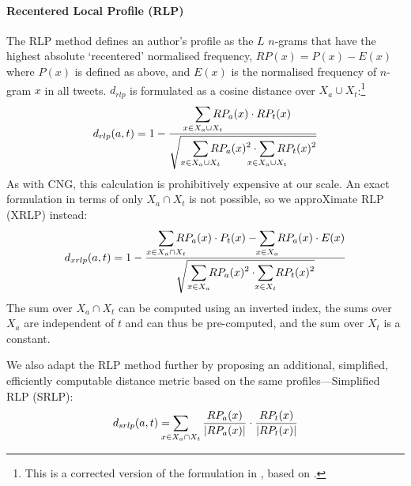 \documentclass[twocolumn,10pt]{article}
\begin{document}
\paragraph{Recentered Local Profile (RLP)} The RLP method\supercite{layton2012recentred}
defines an author's profile as the $L$ $n$-grams that have
the highest absolute `recentered' normalised frequency,
$RP(x) = P(x) - E(x)$ where $P(x)$ is defined as above, and
$E(x)$ is the normalised frequency of $n$-gram $x$ in all tweets.
$d_{rlp}$ is formulated as a cosine distance over
$X_a \cup X_t$:\footnote{
This is a corrected version of the formulation in \cite{layton2012recentred},
based on \cite{layton2014tutorial}.}
$$
d_{rlp}(a, t) = 1 -
\frac{\displaystyle
    \smashoperator{\sum_{x \in X_a \cup X_t}}
        RP_a(x) \cdot RP_t(x)
}{\displaystyle
    \sqrt{\smashoperator[r]{\sum_{x \in X_a \cup X_t}} RP_a(x)^2
    \cdot \smashoperator{\sum_{x \in X_a \cup X_t}} RP_t(x)^2}
}
$$
As with CNG, this calculation is prohibitively expensive at our scale.
An exact formulation in terms of only $X_a \cap X_t$ is not possible,
so we approXimate RLP (XRLP) instead:
$$
d_{xrlp}(a, t) = 1 -
\frac{\displaystyle
    \smashoperator[r]{\sum_{x \in X_a \cap X_t}}
        RP_a(x) \cdot P_t(x)
    - \smashoperator{\sum_{x \in X_a}}
        RP_a(x) \cdot E(x)
}{\displaystyle
    \sqrt{\smashoperator[r]{\sum_{x \in X_a}} RP_a(x)^2
    \cdot \smashoperator{\sum_{x \in X_t}} RP_t(x)^2}
}
$$
The sum over $X_a \cap X_t$ can be computed using an inverted index,
the sums over $X_a$ are independent of $t$ and can thus be pre-computed,
and the sum over $X_t$ is a constant.

We also adapt the RLP method further by proposing an
additional, simplified, efficiently computable distance metric
based on the same profiles---Simplified RLP (SRLP):
$$
d_{srlp}(a, t) =
    \smashoperator[l]{\sum_{x \in X_a \cap X_t}}
        \frac{ RP_a(x) } { |RP_a(x)| }
        \cdot
        \frac{ RP_t(x) }{ |RP_t(x) | }
$$
\end{document}
